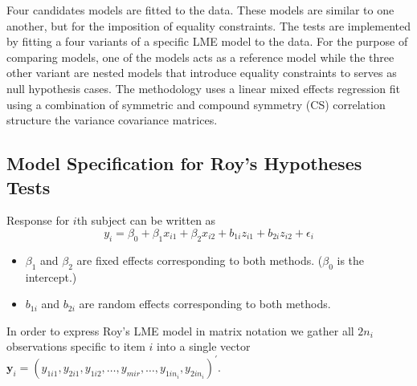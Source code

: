 \documentclass[12pt, a4paper]{report}
\theoremstyle{plain}
\theoremstyle{definition}
\theoremstyle{remark}
\begin{document}
			Four candidates models are fitted to the data. These models are similar to one another, but for the imposition of equality constraints. The tests are implemented by fitting a four variants of a specific LME model to the data. For the purpose of comparing models, one of the models acts as a reference model while the three other variant are nested models that introduce equality constraints to serves as null hypothesis cases. The methodology uses a linear mixed effects regression fit using a combination of symmetric and compound symmetry (CS) correlation structure the variance covariance matrices.
			
			
			\subsection{Model Specification for Roy's Hypotheses Tests}
			
			Response for $i$th subject can be written as
			\[ y_i = \beta_0 + \beta_1x_{i1} + \beta_2x_{i2} + b_{1i}z_{i1}  + b_{2i}z_{i2} + \epsilon_i \]
			\begin{itemize}
				\item $\beta_1$ and $\beta_2$ are fixed effects corresponding to both methods. ($\beta_0$ is the intercept.)
				\item $b_{1i}$ and $b_{2i}$ are random effects corresponding to both methods.
			\end{itemize}
			
			
			
			
			
			
			
			In order to express Roy's LME model in matrix notation we gather all $2n_i$ observations specific to item $i$ into a single vector  $\boldsymbol{y}_{i} = (y_{1i1},y_{2i1},y_{1i2},\ldots,y_{mir},\ldots,y_{1in_{i}},y_{2in_{i}})^\prime.$ 
			
			
			
			
			
\end{document}
